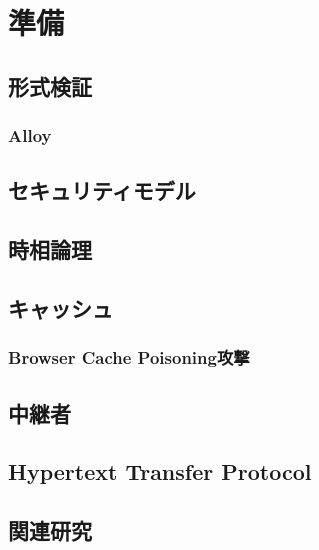 \chapter{準備}
\section{形式検証}
\subsection{Alloy}

\section{セキュリティモデル}

\section{時相論理}

\section{キャッシュ}
\subsection{Browser Cache Poisoning攻撃}

\section{中継者}

\section{Hypertext Transfer Protocol}

\section{関連研究}
